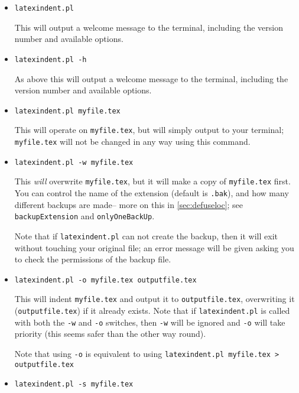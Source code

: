 \begin{itemize}[labelsep=.5cm]
	\item[] \lstinline!latexindent.pl!
												
	This will output a welcome message to the terminal, including the version number
	and available options.
	\item[\verbitem{-h}] \lstinline!latexindent.pl -h!
												
	As above this will output a welcome message to the terminal, including the version number
	and available options.
	\item[] \lstinline!latexindent.pl myfile.tex!
													 		 		 		 		 					
	This will operate on \lstinline!myfile.tex!, but will simply output to your terminal; \lstinline!myfile.tex! will	not be changed in any way using this command. 
	\item[\verbitem{-w}] \lstinline!latexindent.pl -w myfile.tex!
													 		 		 		 		 					
	This \emph{will} overwrite \lstinline!myfile.tex!, but it will
	make a copy of \lstinline!myfile.tex! first. You can control the name of 
	the extension (default is \lstinline!.bak!), and how many different backups are made-- 
	more on this in \cref{sec:defuseloc}; see \lstinline!backupExtension! and \lstinline!onlyOneBackUp!.
													 		 		 		 		 					
	Note that if \lstinline!latexindent.pl! can not create the backup, then it 
	will exit without touching your original file; an error message will be given
	asking you to check the permissions of the backup file.
	\item[\verbitem{-o}] \lstinline!latexindent.pl -o myfile.tex outputfile.tex!
													 		 		 		 		 					
	This will indent \lstinline!myfile.tex! and output it to \lstinline!outputfile.tex!, 
	overwriting it (\lstinline!outputfile.tex!) if it already exists. Note that if \lstinline!latexindent.pl! is called with both
	the \lstinline!-w! and \lstinline!-o! switches, then \lstinline!-w! will
	be ignored and \lstinline!-o! will take priority (this seems safer than the 
	other way round).
													 		 		 		 		 					
	Note that using \lstinline!-o! is equivalent to using \lstinline!latexindent.pl myfile.tex > outputfile.tex!
	\item[\verbitem{-s}] \lstinline!latexindent.pl -s myfile.tex!
													 		 		 		 		 					

\end{itemize}
